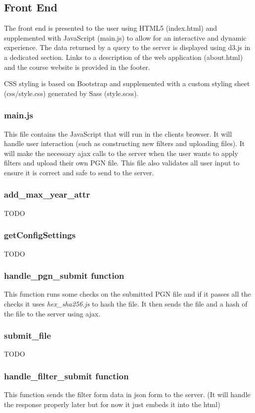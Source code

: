 \documentclass{article}
\begin{document}
\subsection{Front End}
The front end is presented to the user using HTML5 (index.html) and
supplemented with JavaScript (main.js) to allow for an interactive and
dynamic experience.  The data returned by a query to the server is
displayed using d3.js in a dedicated section.  Links to a description
of the web application (about.html) and the course
website is provided in the footer.

CSS styling is based on Bootstrap and supplemented with a custom styling
sheet (css/style.css) generated by Sass (style.scss).

\subsubsection{main.js}
This file contains the JavaScript that will run in the clients browser. It
will handle user interaction (such as constructing new filters and uploading
files). It will make the necessary ajax calls to the server when the user
wants to apply filters and upload their own PGN file. This file also
validates all user input to ensure it is correct and safe to send to the server.

\subsubsection*{add\_max\_year\_attr}
TODO

\subsubsection*{getConfigSettings}
TODO

\subsubsection*{handle\_pgn\_submit function}
This function runs some checks on the submitted PGN file and if it passes
all the checks it uses \textit{hex\_sha256.js} to hash the file. It then
sends the file and a hash of the file to the server using ajax.

\subsubsection*{submit\_file}
TODO

\subsubsection*{handle\_filter\_submit function}
This function sends the filter form data in json form to the server.
(It will handle the response properly later but for now it just embeds it into
the html)
\end{document}
